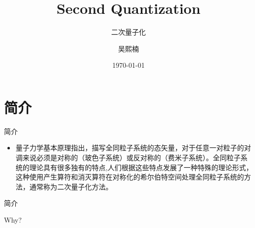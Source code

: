 \documentclass{beamer}
\author{吴熙楠}
\title{Second Quantization}
\subtitle{二次量子化}
\institute{北京大学物理学院}
\date{\today}
\begin{document}
	
	\kaishu
	\begin{frame}
		\titlepage
	\end{frame}
	
	\begin{frame}
		\tableofcontents[sectionstyle=show,subsectionstyle=show/shaded/hide,subsubsectionstyle=show/shaded/hide]
	\end{frame}

	\section{简介}
	\begin{frame}{简介}
		\begin{itemize}
			\item 量子力学基本原理指出，描写全同粒子系统的态矢量，对于任意一对粒子的对调来说必须是对称的（玻色子系统）或反对称的（费米子系统）。全同粒子系统的理论具有很多独有的特点,人们根据这些特点发展了一种特殊的理论形式，这种使用产生算符和消灭算符在对称化的希尔伯特空间处理全同粒子系统的方法，通常称为二次量子化方法。
		\end{itemize}
	\end{frame}
\begin{frame}{简介}
	\begin{center}
		{\Huge\calligra Why? }
	\end{center}
\end{frame}
\end{document}

